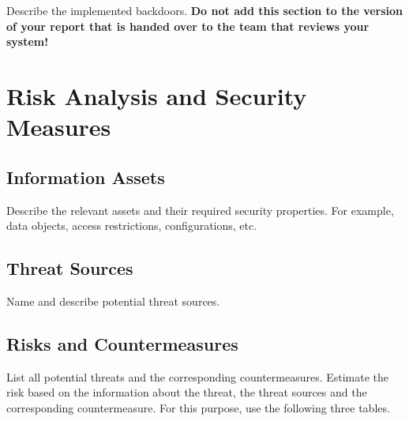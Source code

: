 \documentclass[a4paper, toc=index, 12pt, DIV14, twoside, BCOR2cm, headsepline, numbers=noenddot, bibliography=totoc]{scrbook}
\begin{document}
Describe the implemented backdoors. {\bfseries Do not add
    this section to the version of your report that is handed over to
    the team that reviews your system!}



\chapter{Risk Analysis and Security Measures}

\section{Information Assets}

Describe the relevant assets and their required security
  properties. For example, data objects, access restrictions,
  configurations, etc.

\section{Threat Sources}

Name and describe potential threat sources.

\section{Risks and Countermeasures}

List all potential threats and the
  corresponding countermeasures. Estimate the risk based on 
  the information about the threat, the threat sources and the 
  corresponding countermeasure. For this purpose, use the following three
  tables.

\end{document}
